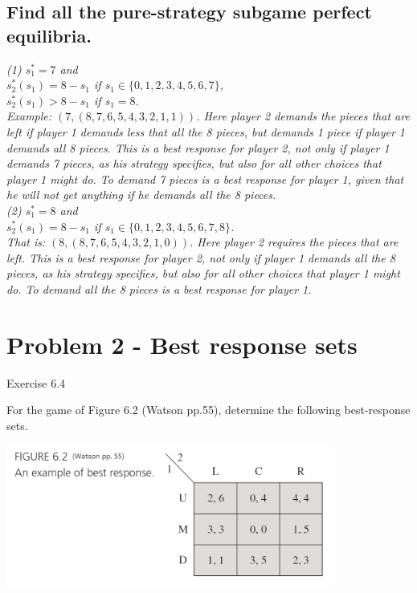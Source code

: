 \documentclass{article}
\begin{document}
\subsection{Find all the pure-strategy subgame perfect equilibria.}

\textit{(1) $s^\ast_1 = 7$ and \\
$s^\ast_2(s_1) = 8 - s_1$ if $s_1 \in \{0,1,2,3,4,5,6,7\}$, \\
$s^\ast_2(s_1) > 8 - s_1$ if $s_1 = 8$. \\
\textit{Example:} $(7, (8,7,6,5,4,3,2,1,1))$\textit{. Here player 2 demands the pieces that are left if player 1 demands less that all the 8 pieces, but demands 1 piece if player 1 demands all 8 pieces. This is a best response for player 2, not only if player 1 demands 7 pieces, as his strategy specifies, but also for all other choices that player 1 might do. To demand 7 pieces is a best response for player 1, given that he will not get anything if he demands all the 8 pieces.}
\\
(2) $s^\ast_1 = 8$ and \\
$s^\ast_2(s_1) = 8 - s_1$ if $s_1 \in \{0,1,2,3,4,5,6,7,8\}$.} \\
\textit{That is:} $(8, (8,7,6,5,4,3,2,1,0))$\textit{. Here player 2 requires the pieces that are left. This is a best response for player 2, not only if player 1 demands all the 8 pieces, as his strategy specifies, but also for all other choices that player 1 might do. To demand all the 8 pieces is a best response for player 1.}
%


\vspace{-6pt}

\bigskip

\section{Problem 2 - Best response sets} 

 Exercise 6.4 

For the game of Figure 6.2 (Watson pp.55), determine the following best-response sets.


{\includegraphics[width=0.8\textwidth]{7.f6_2}
\label{fig:f6_2}}
\vspace{2mm}
\end{document}

